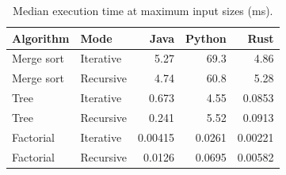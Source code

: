\begin{table}

\caption{\label{tab:execution_time_results}Median execution time at maximum input sizes (ms).}
\centering
\begin{tabular}[t]{llrrr}
\toprule
Algorithm & Mode & Java & Python & Rust\\
\midrule
Merge sort & Iterative & 5.27 & 69.3 & 4.86\\
Merge sort & Recursive & 4.74 & 60.8 & 5.28\\
Tree & Iterative & 0.673 & 4.55 & 0.0853\\
Tree & Recursive & 0.241 & 5.52 & 0.0913\\
Factorial & Iterative & 0.00415 & 0.0261 & 0.00221\\
\addlinespace
Factorial & Recursive & 0.0126 & 0.0695 & 0.00582\\
\bottomrule
\end{tabular}
\end{table}

